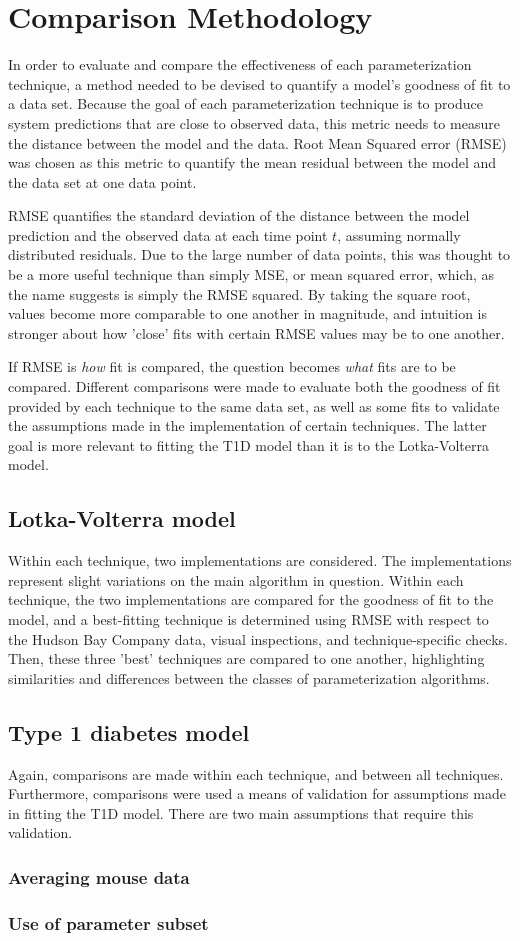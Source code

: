 \documentclass{article}
\begin{document}
\section{Comparison Methodology}
In order to evaluate and compare the effectiveness of each parameterization technique, a method needed to be devised to quantify a model's goodness of fit to a data set. Because the goal of each parameterization technique is to produce system predictions that are close to observed data, this metric needs to measure the distance between the model and the data. Root Mean Squared error (RMSE) was chosen as this metric to quantify the mean residual between the model and the data set at one data point. 
\par RMSE quantifies the standard deviation of the distance between the model prediction and the observed data at each time point $t$, assuming normally distributed residuals. Due to the large number of data points, this was thought to be a more useful technique than simply MSE, or mean squared error, which, as the name suggests is simply the RMSE squared. By taking the square root, values become more comparable to one another in magnitude, and intuition is stronger about how 'close' fits with certain RMSE values may be to one another.
\par If RMSE is \emph{how} fit is compared, the question becomes \emph{what} fits are to be compared. Different comparisons were made to evaluate both the goodness of fit provided by each technique to the same data set, as well as some fits to validate the assumptions made in the implementation of certain techniques. The latter goal is more relevant to fitting the T1D model than it is to the Lotka-Volterra model. 
\subsection{Lotka-Volterra model}
Within each technique, two implementations are considered. The implementations represent slight variations on the main algorithm in question. Within each technique, the two implementations are compared for the goodness of fit to the model, and a best-fitting technique is determined using RMSE with respect to the Hudson Bay Company data, visual inspections, and technique-specific checks. Then, these three 'best' techniques are compared to one another, highlighting similarities and differences between the classes of parameterization algorithms. 
\subsection{Type 1 diabetes model}
Again, comparisons are made within each technique, and between all techniques. 
Furthermore, comparisons were used a means of validation for assumptions made in fitting the T1D model. There are two main assumptions that require this validation.
\subsubsection{Averaging mouse data}
\subsubsection{Use of parameter subset}
\end{document}
